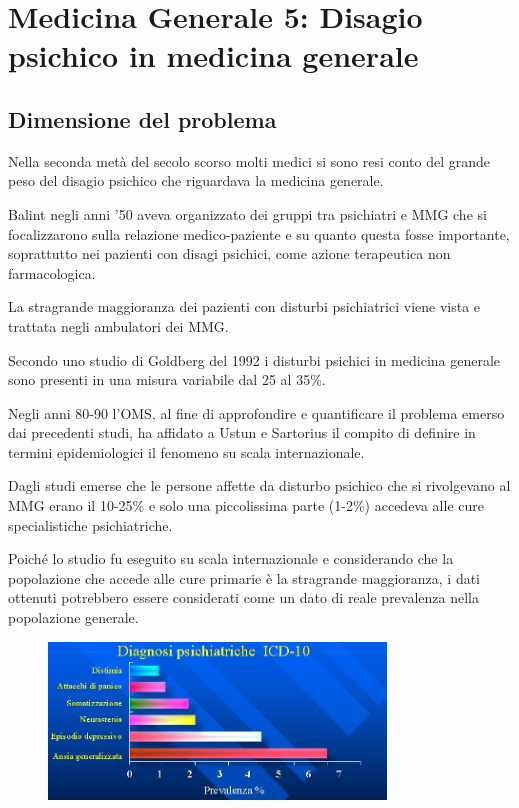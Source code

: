 \section{Medicina Generale 5: Disagio psichico in medicina generale}

\subsection{Dimensione del problema}

Nella seconda metà del secolo scorso molti medici si sono resi conto del
grande peso del disagio psichico che riguardava la medicina generale.

Balint negli anni '50 aveva organizzato dei gruppi tra psichiatri e MMG
che si focalizzarono sulla relazione medico-paziente e su quanto questa
fosse importante, soprattutto nei pazienti con disagi psichici, come
azione terapeutica non farmacologica.

La stragrande maggioranza dei pazienti con disturbi psichiatrici viene
vista e trattata negli ambulatori dei MMG.

Secondo uno studio di Goldberg del 1992 i disturbi psichici in medicina
generale sono presenti in una misura variabile dal 25 al 35\%.

Negli anni 80-90 l'OMS, al fine di approfondire e quantificare il
problema emerso dai precedenti studi, ha affidato a Ustun e Sartorius il
compito di definire in termini epidemiologici il fenomeno su scala
internazionale.

Dagli studi emerse che le persone affette da disturbo psichico che si
rivolgevano al MMG erano il 10-25\% e solo una piccolissima parte
(1-2\%) accedeva alle cure specialistiche psichiatriche.

Poiché lo studio fu eseguito su scala internazionale e considerando che
la popolazione che accede alle cure primarie è la stragrande
maggioranza, i dati ottenuti potrebbero essere considerati come un dato
di reale prevalenza nella popolazione generale.

\begin{figure}[!ht]
\centering
	\includegraphics[width=0.8\textwidth]{42/image1.jpeg}
	\end{figure}
	
